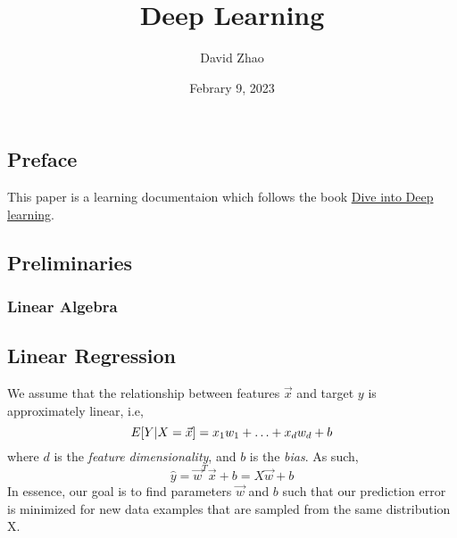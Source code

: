 \documentclass[a4paper,12pt]{article}
\theoremstyle{definition}
\begin{document}
\title{Deep Learning}
\author{David Zhao}
\date{Febrary 9, 2023}
\maketitle

\subsection*{Preface}
This paper is a learning documentaion which follows the book \href{https://d2l.ai/}{Dive into Deep learning}.

\subsection*{Preliminaries}
\subsubsection*{Linear Algebra}




\subsection*{Linear Regression}
    We assume that the relationship between features $\vec{x}$ and target $y$ is approximately linear, i.e,
    \begin{equation}
        E[Y|X=\vec{x}] = x_1w_1 + \ldots + x_dw_d + b \\
    \end{equation}
    where $d$ is the \textit{feature dimensionality}, and $b$ is the \textit{bias}. As such,
    \begin{equation}
        \hat{y} = \vec{w}^T\vec{x} + b
                = X\vec{w} + b
    \end{equation}
    In essence, our goal is to find parameters $\vec{w}$ and $b$ such that our prediction error is 
    minimized for new data examples that are sampled from the same distribution X.
\end{document}

